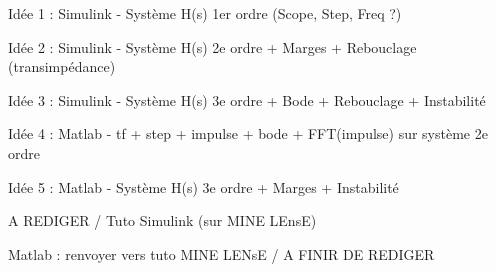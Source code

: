 \documentclass[a4paper,french]{paper}
\author{Julien VILLEMEJANE}
\subtitle{Bloc4}
\title{\titre}
\begin{document}
 
\enteteThematiqueObligatoire{}


Idée 1 : Simulink - Système H(s) 1er ordre (Scope, Step, Freq ?)

Idée 2 : Simulink - Système H(s) 2e ordre + Marges + Rebouclage (transimpédance)

Idée 3 : Simulink - Système H(s) 3e ordre + Bode + Rebouclage + Instabilité

Idée 4 : Matlab - tf + step + impulse + bode + FFT(impulse) sur système 2e ordre 

Idée 5 : Matlab - Système H(s) 3e ordre + Marges + Instabilité

A REDIGER / Tuto Simulink (sur MINE LEnsE)

Matlab : renvoyer vers tuto MINE LENsE / A FINIR DE REDIGER





%
\end{document}
